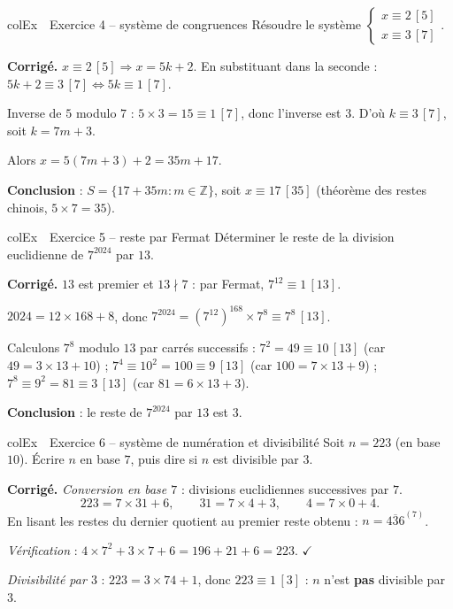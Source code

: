 \documentclass[11pt,a4paper]{article}
\newenvironment{exemple}[1][Exemple]
  {\begin{fiche}{colEx}{\ding{217}~~#1}}{\end{fiche}}
\begin{document}
\begin{exemple}[Exercice 4 -- système de congruences]
Résoudre le système $\begin{cases} x\equiv2\,[5] \\ x\equiv3\,[7] \end{cases}$.

\smallskip
\textbf{Corrigé.} $x\equiv2\,[5]\Rightarrow x=5k+2$. En substituant dans la seconde : $5k+2\equiv3\,[7]\iff5k\equiv1\,[7]$.

\smallskip
Inverse de $5$ modulo $7$ : $5\times3=15\equiv1\,[7]$, donc l'inverse est $3$. D'où $k\equiv3\,[7]$, soit $k=7m+3$.

\smallskip
Alors $x=5(7m+3)+2=35m+17$.

\smallskip
\textbf{Conclusion} : $S=\{17+35m : m\in\mathbb{Z}\}$, soit $x\equiv17\,[35]$ (théorème des restes chinois, $5\times7=35$).
\end{exemple}

\begin{exemple}[Exercice 5 -- reste par Fermat]
Déterminer le reste de la division euclidienne de $7^{2024}$ par $13$.

\smallskip
\textbf{Corrigé.} $13$ est premier et $13\nmid7$ : par Fermat, $7^{12}\equiv1\,[13]$.

\smallskip
$2024 = 12\times168+8$, donc $7^{2024}=\left(7^{12}\right)^{168}\times7^8\equiv7^8\,[13]$.

\smallskip
Calculons $7^8$ modulo $13$ par carrés successifs : $7^2=49\equiv10\,[13]$ (car $49=3\times13+10$) ; $7^4\equiv10^2=100\equiv9\,[13]$ (car $100=7\times13+9$) ; $7^8\equiv9^2=81\equiv3\,[13]$ (car $81=6\times13+3$).

\smallskip
\textbf{Conclusion} : le reste de $7^{2024}$ par $13$ est $3$.
\end{exemple}

\begin{exemple}[Exercice 6 -- système de numération et divisibilité]
Soit $n=223$ (en base $10$). Écrire $n$ en base $7$, puis dire si $n$ est divisible par $3$.

\smallskip
\textbf{Corrigé.} \emph{Conversion en base $7$} : divisions euclidiennes successives par $7$.
\[
  223=7\times31+6, \qquad 31=7\times4+3, \qquad 4=7\times0+4.
\]
En lisant les restes du dernier quotient au premier reste obtenu : $n=\overline{436}^{(7)}$.

\smallskip
\emph{Vérification} : $4\times7^2+3\times7+6 = 196+21+6 = 223$. $\checkmark$

\smallskip
\emph{Divisibilité par $3$} : $223=3\times74+1$, donc $223\equiv1\,[3]$ : $n$ n'est \textbf{pas} divisible par $3$.
\end{exemple}
\end{document}
